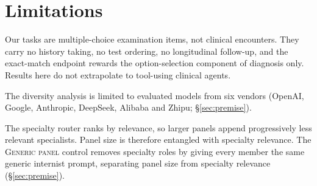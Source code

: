 \section{Limitations}
\label{sec:limitations}

Our tasks are multiple-choice examination items, not clinical encounters. They carry no history
taking, no test ordering, no longitudinal follow-up, and the exact-match endpoint rewards the
option-selection component of diagnosis only. Results here do not extrapolate to tool-using
clinical agents.

The diversity analysis is limited to evaluated models from six vendors (OpenAI, Google,
Anthropic, DeepSeek, Alibaba and Zhipu; \S\ref{sec:premise}).

The specialty router ranks by relevance, so larger panels append progressively less relevant
specialists. Panel size is therefore entangled with specialty relevance. The \textsc{Generic
panel} control removes specialty roles by giving every member the same generic internist prompt,
separating panel size from specialty relevance (\S\ref{sec:premise}).
